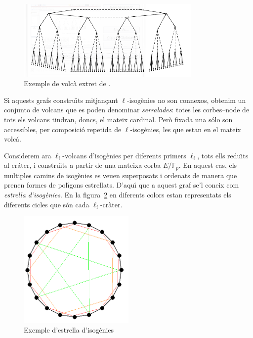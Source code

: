 \documentclass[12pt,twoside,catalan,a4paper]{book}%
\numberwithin{figure}{section}		%
\theoremstyle{definition}   			%
\newcommand{\Fp}{\ensuremath{\mathbb{F}_p}}%
\theoremstyle{saltolinea}   			%
\begin{document}
\begin{figure}[ht]
\centering
\includegraphics[width=0.8\textwidth]{imatges/volca.png}
\caption{Exemple de volc\`a extret de \cite{VolcanIso}.\label{fig:volca}}
\end{figure}

S\'{\i} aquests grafs constru\"{\i}ts mitjan\c{c}ant $\ell$\/-isog\`enies no son connexos, obtenim un conjunto de volcans que es poden denominar \emph{serralades}: totes les corbes--node de tots els volcans tindran, doncs, el mateix cardinal. Per\`o fixada una s\'olo son accessibles, per composici\'o repetida de $\ell$\/-isog\`enies, les que estan en el mateix volc\'a.

Considerem ara $\ell_i$\/-volcans d'isog\`enies per diferents primers $\ell_i$, tots ells redu\"{\i}ts al cr\'ater, i constru\"{\i}ts a partir de una mateixa corba $E/\Fp$. En aquest cas, els multiples camins de isog\`enies es veuen superposats i ordenats de manera que prenen formes de pol\'{\i}gons estrellats. D'aqu\'{\i} que a aquest graf se'l coneix com \emph{estrella d'isog\`enies}. En la figura~\ref{fig:estrella} en diferents colors estan representats els diferents cicles que s\'on cada $\ell_i$\/-cr\`ater.

\begin{figure}[ht]
\centering
\includegraphics[width=0.5\textwidth]{imatges/estrella2.png}
\caption{Exemple d'estrella d'isog\`enies\label{fig:estrella}}
\end{figure}
\end{document}
